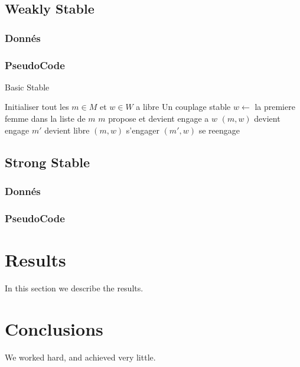 \documentclass[11pt]{article}
\begin{document}
\subsection{Weakly Stable}
\subsubsection{Donn\'es}
\subsubsection{PseudoCode}
\begin{algorithm}
\caption{Basic Stable}
\begin{algorithmic} 
\REQUIRE Initialiser tout les $m \in M$ et $w \in W$ a libre
\ENSURE Un couplage stable
\STATE $w \leftarrow$ la premiere femme dans la liste de $m$
\STATE $m$ propose et devient engage a $w$
\STATE $(m, w)$ devient engage
\STATE $m'$ devient libre
\STATE $(m, w)$ s'engager
\ELSE
\STATE $(m', w)$ se reengage
\ENDIF
\ENDIF
\ENDWHILE
\end{algorithmic}
\end{algorithm}

    
\subsection{Strong Stable}
\subsubsection{Donn\'es}
\subsubsection{PseudoCode}

\section{Results}\label{results}
In this section we describe the results.

\section{Conclusions}\label{conclusions}
We worked hard, and achieved very little.



\end{document}
